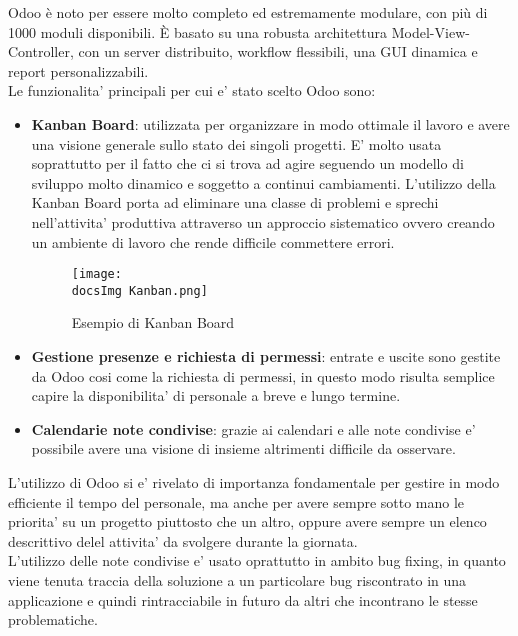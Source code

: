 Odoo è noto per essere molto completo ed estremamente modulare, con più di 1000 moduli disponibili. È basato su una robusta architettura Model-View-Controller, con un server distribuito, workflow flessibili, una GUI dinamica e report personalizzabili.
\\
Le funzionalita' principali per cui e' stato scelto Odoo sono:

\begin{itemize}
	\item \textbf{Kanban Board}: utilizzata per organizzare in modo ottimale il lavoro e avere una visione generale sullo stato dei singoli progetti. E' molto usata soprattutto per il fatto che ci si trova ad agire seguendo un modello di sviluppo molto dinamico e soggetto a continui cambiamenti. L'utilizzo della Kanban Board porta ad eliminare una classe di problemi e sprechi nell'attivita' produttiva attraverso un approccio sistematico ovvero creando un ambiente di lavoro che rende difficile commettere errori.
	
	\begin{figure}[H]
		\centering
		\texttt{[image: \\docsImg Kanban.png]}
		\caption{Esempio di Kanban Board}
		\label{fig:Esempio di Kanban Board}
	\end{figure}
	
	\item \textbf{Gestione presenze e richiesta di permessi}: entrate e uscite sono gestite da Odoo cosi come la richiesta di permessi, in questo modo risulta semplice capire la disponibilita' di personale a breve e lungo termine.
	
	\item \textbf{Calendarie note condivise}: grazie ai calendari e alle note condivise e' possibile avere una visione di insieme altrimenti difficile da osservare.	

\end{itemize}

L'utilizzo di Odoo si e' rivelato di importanza fondamentale per gestire in modo efficiente il tempo del personale, ma anche per avere sempre sotto mano le priorita' su un progetto piuttosto che un altro, oppure avere sempre un elenco descrittivo delel attivita' da svolgere durante la giornata.
\\
L'utilizzo delle note condivise e' usato oprattutto in ambito bug fixing, in quanto viene tenuta traccia della soluzione a un particolare bug riscontrato in una applicazione e quindi rintracciabile in futuro da altri che incontrano le stesse problematiche.

